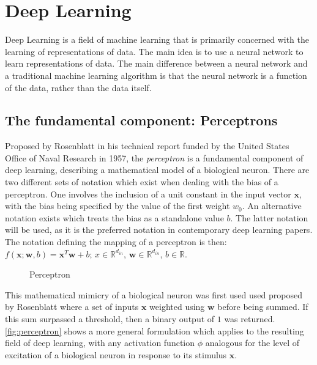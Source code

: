 \section{Deep Learning\label{sec:DL}}
Deep Learning is a field of machine learning that is primarily concerned with
the learning of representations of data. The main idea is to use a neural
network to learn representations of data. The main difference between a
neural network and a traditional machine learning algorithm is that the
neural network is a function of the data, rather than the data itself.

\subsection{The fundamental component: Perceptrons}

Proposed by Rosenblatt \cite{Rosenblatt_1957_6098} in his technical
report funded by the United States Office of Naval Research
\cite{doi:10.1177/030631296026003005} in 1957, the \textit{perceptron} is a
fundamental component of deep learning, describing a mathematical model of a
biological neuron. There are two different sets of notation which exist when
dealing with the bias of a perceptron. One involves the inclusion of a unit
constant in the input vector $\mathbf{x}$, with the bias being specified by the
value of the first weight $w_0$. An alternative notation exists which treats the
bias as a standalone value $b$. The latter notation will be used, as it is the
preferred notation in contemporary deep learning papers. The notation defining
the mapping of a perceptron is then: $f(\mathbf{x};\mathbf{w},
b)=\mathbf{x}^T\mathbf{w}+b$; $x\in\mathbb{R}^{d_{in}}$,
$\mathbf{w}\in\mathbb{R}^{d_{in}}$, $b\in\mathbb{R}$.

\begin{figure}[htbp]
    \centering
    
    \caption{Perceptron}
    \label{fig:perceptron}
\end{figure}

This mathematical mimicry of a biological neuron was first used used proposed by
Rosenblatt where a set of inputs $\mathbf{x}$ weighted using $\mathbf{w}$ before
being summed. If this sum surpassed a threshold, then a binary output of $1$ was
returned. \autoref{fig:perceptron} shows a more general formulation which
applies to the resulting field of deep learning, with any activation function
$\phi$ analogous for the level of excitation of a biological neuron in response
to its stimulus $\mathbf{x}$.

